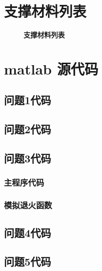 \documentclass[zihao=-4, UTF8]{article}		%
\theoremstyle{MyLineTheoremStyle} %
\theoremstyle{MyBlockTheoremStyle} %
\theoremstyle{MySubsubsectionStyle} %
\begin{document}
\section{支撑材料列表}
\begin{figure}[H]\centering

\caption{\bfseries 支撑材料列表}\label{支撑材料列表}
\end{figure}

\section{matlab 源代码}

\subsection{问题1代码}


\subsection{问题2代码}


\subsection{问题3代码}
\subsubsection{主程序代码}

\subsubsection{模拟退火函数}


\subsection{问题4代码}


\subsection{问题5代码}

\end{document}
